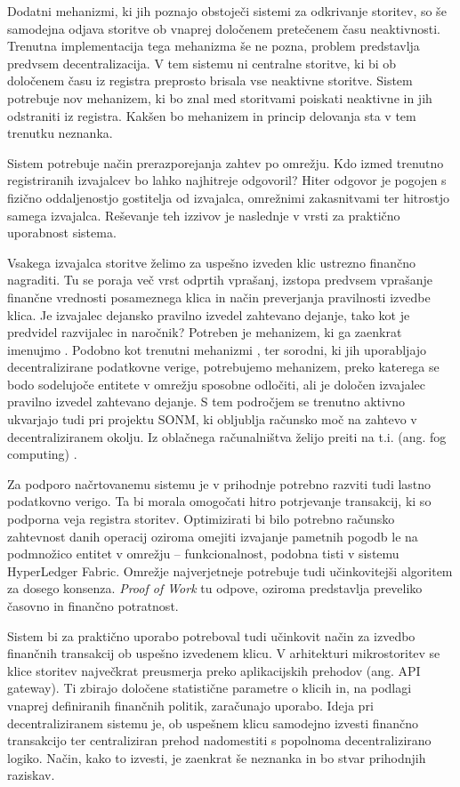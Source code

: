 \documentclass[a4paper, 12pt]{book}
\begin{document}
Dodatni mehanizmi, ki jih poznajo obstoječi sistemi za odkrivanje storitev, so še samodejna odjava storitve ob vnaprej določenem pretečenem času neaktivnosti.
Trenutna implementacija tega mehanizma še ne pozna, problem predstavlja predvsem decentralizacija.
V tem sistemu ni centralne storitve, ki bi ob določenem času iz registra preprosto brisala vse neaktivne storitve.
Sistem potrebuje nov mehanizem, ki bo znal med storitvami poiskati neaktivne in jih odstraniti iz registra.
Kakšen bo mehanizem in princip delovanja sta v tem trenutku neznanka.

Sistem potrebuje način prerazporejanja zahtev po omrežju.
Kdo izmed trenutno registriranih izvajalcev bo lahko najhitreje odgovoril?
Hiter odgovor je pogojen s fizično oddaljenostjo gostitelja od izvajalca, omrežnimi zakasnitvami ter hitrostjo samega izvajalca. Reševanje teh izzivov je naslednje v vrsti za praktično uporabnost sistema.


Vsakega izvajalca storitve želimo za uspešno izveden klic ustrezno finančno nagraditi. Tu se poraja več vrst odprtih vprašanj, izstopa predvsem vprašanje finančne vrednosti posameznega klica in način preverjanja pravilnosti izvedbe klica.
Je izvajalec dejansko pravilno izvedel zahtevano dejanje, tako kot je predvidel razvijalec in naročnik?
Potreben je mehanizem, ki ga zaenkrat imenujmo .
Podobno kot trenutni mehanizmi ,  ter sorodni, ki jih uporabljajo decentralizirane podatkovne verige, potrebujemo mehanizem, preko katerega se bodo sodelujoče entitete v omrežju sposobne odločiti, ali je določen izvajalec pravilno izvedel zahtevano dejanje.
S tem področjem se trenutno aktivno ukvarjajo tudi pri projektu SONM, ki obljublja računsko moč na zahtevo v decentraliziranem okolju. Iz oblačnega računalništva želijo preiti na t.i.  (ang. fog computing) \cite{Sonm}.

Za podporo načrtovanemu sistemu je v prihodnje potrebno razviti tudi lastno podatkovno verigo.
Ta bi morala omogočati hitro potrjevanje transakcij, ki so podporna veja registra storitev.
Optimizirati bi bilo potrebno računsko zahtevnost danih operacij oziroma omejiti izvajanje pametnih pogodb le na podmnožico entitet v omrežju -- funkcionalnost, podobna tisti v sistemu HyperLedger Fabric.
Omrežje najverjetneje potrebuje tudi učinkovitejši algoritem za dosego konsenza.
\textit{Proof of Work} tu odpove, oziroma predstavlja preveliko časovno in finančno potratnost.

Sistem bi za praktično uporabo potreboval tudi učinkovit način za izvedbo finančnih transakcij ob uspešno izvedenem klicu.
V arhitekturi mikrostoritev se klice storitev največkrat preusmerja preko aplikacijskih prehodov (ang. API gateway).
Ti zbirajo določene statistične parametre o klicih in, na podlagi vnaprej definiranih finančnih politik, zaračunajo uporabo.
Ideja pri decentraliziranem sistemu je, ob uspešnem klicu samodejno izvesti finančno transakcijo ter centraliziran prehod nadomestiti s popolnoma decentralizirano logiko.
Način, kako to izvesti, je zaenkrat še neznanka in bo stvar prihodnjih raziskav.
\end{document}
